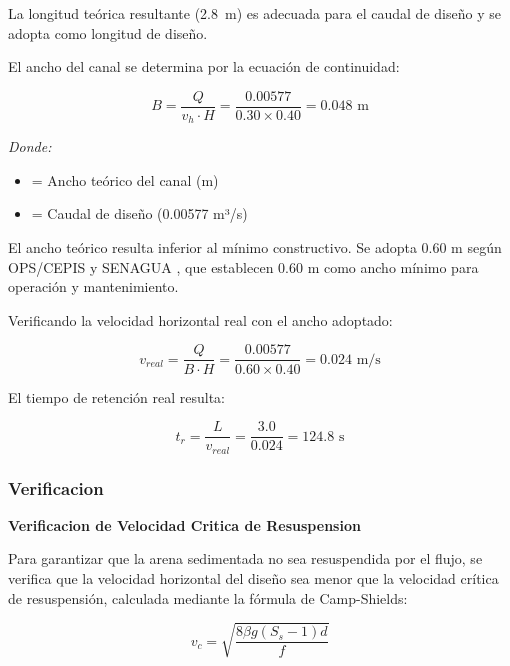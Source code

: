 \documentclass[12pt,a4paper]{article}
\begin{document}
La longitud te\'orica resultante (2.8~m) es adecuada para el caudal de dise\~no y se adopta como longitud de dise\~no.

El ancho del canal se determina por la ecuaci\'on de continuidad:

\begin{equation}
B = \frac{Q}{v_h \cdot H} = \frac{0.00577}{0.30 \times 0.40} = 0.048 \text{ m}
\end{equation}

\textit{Donde:}
\begin{itemize}[noitemsep,leftmargin=2em]
    \item[$B$] = Ancho te\'orico del canal (m)
    \item[$Q$] = Caudal de dise\~no (0.00577 m³/s)
\end{itemize}

El ancho te\'orico resulta inferior al m\'inimo constructivo. Se adopta 0.60 m seg\'un OPS/CEPIS \cite{ops2005} y SENAGUA \cite{senagua2012}, que establecen 0.60 m como ancho m\'inimo para operaci\'on y mantenimiento.

Verificando la velocidad horizontal real con el ancho adoptado:

\begin{equation}
v_{real} = \frac{Q}{B \cdot H} = \frac{0.00577}{0.60 \times 0.40} = 0.024 \text{ m/s}
\end{equation}

El tiempo de retenci\'on real resulta:

\begin{equation}
t_r = \frac{L}{v_{real}} = \frac{3.0}{0.024} = 124.8 \text{ s}
\end{equation}

\subsubsection{Verificacion}

\textbf{Verificacion de Velocidad Critica de Resuspension}

Para garantizar que la arena sedimentada no sea resuspendida por el flujo, se verifica que la velocidad horizontal del dise\~no sea menor que la velocidad cr\'itica de resuspensi\'on, calculada mediante la f\'ormula de Camp-Shields:

\begin{equation}
v_c = \sqrt{\frac{8 \beta g (S_s - 1) d}{f}}
\end{equation}
\end{document}
